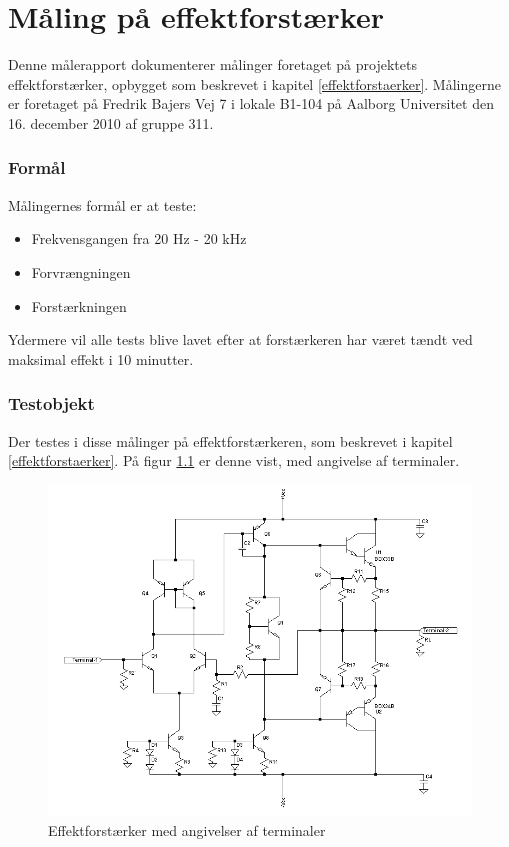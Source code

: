 \chapter{Måling på effektforstærker}
\label{maalejournal}

Denne målerapport dokumenterer målinger foretaget på projektets effektforstærker, opbygget som beskrevet i kapitel \ref{effektforstaerker}. Målingerne er foretaget på Fredrik Bajers Vej 7 i lokale B1-104 på Aalborg Universitet den 16. december 2010 af gruppe 311.

\subsection*{Formål}

Målingernes formål er at teste:
\begin{itemize}
\item Frekvensgangen fra 20 Hz - 20 kHz
\item Forvrængningen
\item Forstærkningen
\end{itemize}
Ydermere vil alle tests blive lavet efter at forstærkeren har været tændt ved maksimal effekt i 10 minutter.

\subsection*{Testobjekt}
Der testes i disse målinger på effektforstærkeren, som beskrevet i kapitel \ref{effektforstaerker}. På figur \ref{fig:testob_efforstaerker} er denne vist, med angivelse af terminaler.

\begin{figure}[h]
\centering
\includegraphics[width=\textwidth]{maalerapporter/effektforstaerker/effektforstaerker_maelerapport.png}
\caption{Effektforstærker med angivelser af terminaler}
\label{fig:testob_efforstaerker}
\end{figure}

